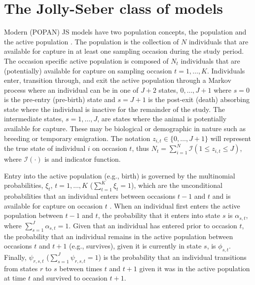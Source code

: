 \documentclass[11pt]{article}
\begin{document}
\section{The Jolly-Seber class of models}

Modern (POPAN) JS models have two population concepts, the population and the active population \citep{crosbie1985parsimonious,schwarz1996general}. The population is the collection of $N$ individuals that are available for capture in at least one sampling occasion during the study period. The occasion specific active population is composed of $N_t$ individuals that are (potentially) available for capture on sampling occasion $t=1,\dots,K$. Individuals enter, transition through, and exit the active population through a Markov process where an individual can be in one of $J+2$ states, $0,\dots,J+1$ where $s=0$ is the pre-entry (pre-birth) state and $s = J+1$ is the post-exit (death) absorbing state where the individual is inactive for the remainder of the study. The intermediate states,  $s = 1,\dots,J$, are states where the animal is potentially available for capture. These may be biological or demographic in nature such as breeding or temporary emigration. The notation $z_{i,t} \in \{0,\dots,J+1\}$ will represent the true state of individual $i$ on occasion $t$, thus $N_t = \sum_{i=1}^N \mathcal{I}(1 \le z_{i,t} \le J)$, where $\mathcal{I}(\cdot)$ is and indicator function. 

Entry into the active population (e.g., birth) is governed by the multinomial probabilities, $\xi_t$, $t=1,\dots,K$ ($\sum_{t=1}^K\xi_t = 1$),  which are the unconditional probabilities that an individual enters between occasions $t-1$ and $t$ and is available for capture on occasion $t$  \citep{crosbie1985parsimonious,schwarz1996general}. When an individual first enters the active population between $t-1$ and $t$, the probability that it enters into state $s$ is $\alpha_{s,t}$, where $\sum_{s=1}^{J} \alpha_{s,t}=1$. Given that an individual has entered prior to occasion $t$, the probability that an individual remains in the active population between occasions $t$ and $t+1$ (e.g., survives), given it is currently in state $s$, is $\phi_{s,t}$. Finally, $\psi_{r,s,t}$ ($\sum_{s=1}^{J}\psi_{r,s,t} = 1$) is the probability that an individual transitions from states $r$ to $s$ between times $t$ and $t+1$ given it was in the active population at time $t$ and survived to occasion $t+1$. 
\end{document}
